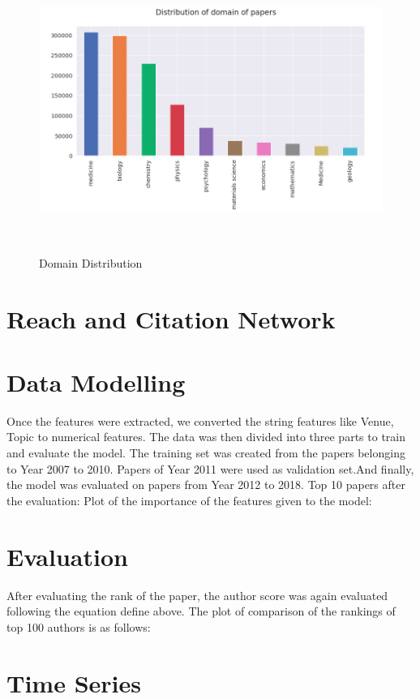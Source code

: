 \documentclass[a4paper, 11pt]{article}
\begin{document}
\begin{itemize}
    \begin{figure}[ht]
    \centering
  \includegraphics[width=0.8\columnwidth]{Domain_Dist.png}
  \caption{Domain Distribution}~\label{fig:Reach}
\end{figure}
\FloatBarrier
\end{itemize}

\section*{Reach and Citation Network}

\section*{Data Modelling}
Once the features were extracted, we converted the string features like Venue, Topic to numerical features. The data was then divided into three parts to train and evaluate the model. The training set was created from the papers belonging to Year 2007 to 2010. Papers of Year 2011 were used as validation set.And finally, the model was evaluated on papers from Year 2012 to 2018.\newline 
Top 10 papers after the evaluation:
\newline
Plot of the importance of the features given to the model:\newline

\section*{Evaluation}
After evaluating the rank of the paper, the author score was again evaluated following the equation define above. The plot of comparison of the rankings of top 100 authors is as follows:



\section*{Time Series}
\end{document}
